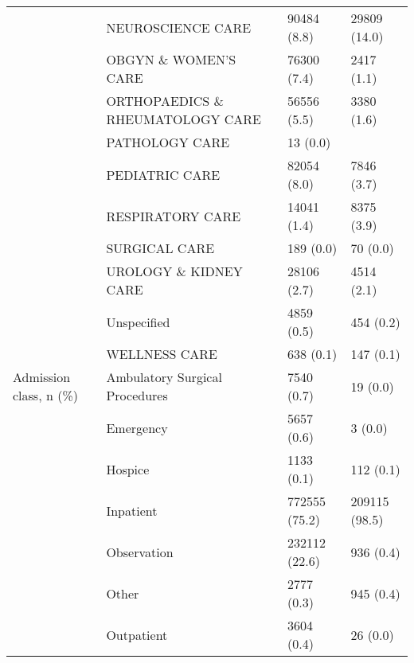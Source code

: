 \begin{tabular}{llll}
                                       & NEUROSCIENCE CARE &                           90484 (8.8) &      29809 (14.0) \\
                                       & OBGYN \& WOMEN'S CARE &                           76300 (7.4) &        2417 (1.1) \\
                                       & ORTHOPAEDICS \& RHEUMATOLOGY CARE &                           56556 (5.5) &        3380 (1.6) \\
                                       & PATHOLOGY CARE &                              13 (0.0) &                   \\
                                       & PEDIATRIC CARE &                           82054 (8.0) &        7846 (3.7) \\
                                       & RESPIRATORY CARE &                           14041 (1.4) &        8375 (3.9) \\
                                       & SURGICAL CARE &                             189 (0.0) &          70 (0.0) \\
                                       & UROLOGY \& KIDNEY CARE &                           28106 (2.7) &        4514 (2.1) \\
                                       & Unspecified &                            4859 (0.5) &         454 (0.2) \\
                                       & WELLNESS CARE &                             638 (0.1) &         147 (0.1) \\
Admission class, n (\%) & Ambulatory Surgical Procedures &                            7540 (0.7) &          19 (0.0) \\
                                       & Emergency &                            5657 (0.6) &           3 (0.0) \\
                                       & Hospice &                            1133 (0.1) &         112 (0.1) \\
                                       & Inpatient &                         772555 (75.2) &     209115 (98.5) \\
                                       & Observation &                         232112 (22.6) &         936 (0.4) \\
                                       & Other &                            2777 (0.3) &         945 (0.4) \\
                                       & Outpatient &                            3604 (0.4) &          26 (0.0) \\

\end{tabular}
